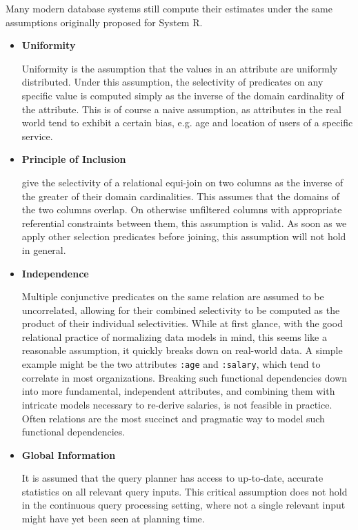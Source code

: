 \documentclass[../index.tex]{subfiles}
\begin{document}
Many modern database systems still compute their estimates under the
same assumptions originally proposed for System R.

\begin{itemize}
\item \textbf{Uniformity}

  Uniformity is the assumption that the values in an attribute are
  uniformly distributed. Under this assumption, the selectivity of
  predicates on any specific value is computed simply as the inverse
  of the domain cardinality of the attribute. This is of course a
  naive assumption, as attributes in the real world tend to exhibit a
  certain bias, e.g. age and location of users of a specific service.

\item \textbf{Principle of Inclusion}

  \cite{selinger1979access} give the selectivity of a relational
  equi-join on two columns as the inverse of the greater of their
  domain cardinalities. This assumes that the domains of the two
  columns overlap. On otherwise unfiltered columns with appropriate
  referential constraints between them, this assumption is valid. As
  soon as we apply other selection predicates before joining, this
  assumption will not hold in general.

\item \textbf{Independence}

  Multiple conjunctive predicates on the same relation are assumed to
  be uncorrelated, allowing for their combined selectivity to be
  computed as the product of their individual selectivities. While at
  first glance, with the good relational practice of normalizing data
  models in mind, this seems like a reasonable assumption, it quickly
  breaks down on real-world data. A simple example might be the two
  attributes \texttt{:age} and \texttt{:salary}, which tend to
  correlate in most organizations. Breaking such functional
  dependencies down into more fundamental, independent attributes, and
  combining them with intricate models necessary to re-derive
  salaries, is not feasible in practice. Often relations are the most
  succinct and pragmatic way to model such functional dependencies.

\item \textbf{Global Information}

  It is assumed that the query planner has access to up-to-date,
  accurate statistics on all relevant query inputs. This critical
  assumption does not hold in the continuous query processing setting,
  where not a single relevant input might have yet been seen at
  planning time.

\end{itemize}
\end{document}
